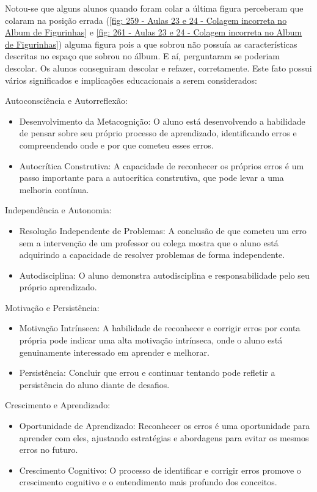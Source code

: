 Notou-se que alguns alunos quando foram colar a última figura perceberam que colaram na posição errada (\autoref{fig: 259 - Aulas 23 e 24 - Colagem incorreta no Album de Figurinhas} e \autoref{fig: 261 - Aulas 23 e 24 - Colagem incorreta no Album de Figurinhas}) alguma figura pois a que sobrou não possuía as características descritas no espaço que sobrou no álbum. E aí, perguntaram se poderiam descolar. Os alunos conseguiram descolar e refazer, corretamente. Este fato possui vários significados e implicações educacionais a serem considerados:

Autoconsciência e Autorreflexão:

\begin{itemize}
    \item Desenvolvimento da Metacognição: O aluno está desenvolvendo a habilidade de pensar sobre seu próprio processo de aprendizado, identificando erros e compreendendo onde e por que cometeu esses erros.
    \item Autocrítica Construtiva: A capacidade de reconhecer os próprios erros é um passo importante para a autocrítica construtiva, que pode levar a uma melhoria contínua.
\end{itemize}

Independência e Autonomia:

\begin{itemize}
    \item Resolução Independente de Problemas: A conclusão de que cometeu um erro sem a intervenção de um professor ou colega mostra que o aluno está adquirindo a capacidade de resolver problemas de forma independente.
    \item Autodisciplina: O aluno demonstra autodisciplina e responsabilidade pelo seu próprio aprendizado.
\end{itemize}

Motivação e Persistência:

\begin{itemize}
    \item Motivação Intrínseca: A habilidade de reconhecer e corrigir erros por conta própria pode indicar uma alta motivação intrínseca, onde o aluno está genuinamente interessado em aprender e melhorar.
    \item Persistência: Concluir que errou e continuar tentando pode refletir a persistência do aluno diante de desafios.
\end{itemize}

Crescimento e Aprendizado:

\begin{itemize}
    \item Oportunidade de Aprendizado: Reconhecer os erros é uma oportunidade para aprender com eles, ajustando estratégias e abordagens para evitar os mesmos erros no futuro.
    \item Crescimento Cognitivo: O processo de identificar e corrigir erros promove o crescimento cognitivo e o entendimento mais profundo dos conceitos.
\end{itemize}


